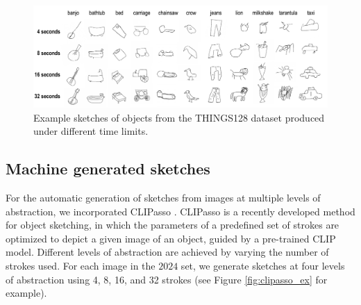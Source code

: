 \documentclass[10pt,letterpaper]{article}
\begin{document}
\begin{figure}
    \centering
    \includegraphics[width= 1\linewidth]{figures/thingsdraw_gallery_alpha.pdf}
    \caption{Example sketches of objects from the THINGS128 dataset produced under different time limits.}
    \label{fig:gallery}
\end{figure}

\subsection{Machine generated sketches}
For the automatic generation of sketches from images at multiple levels of abstraction, we incorporated CLIPasso \cite{vinker2022clipasso}.
CLIPasso is a recently developed method for object sketching, in which the parameters of a predefined set of strokes are optimized to depict a given image of an object, guided by a pre-trained CLIP \cite{radford2021learning} model.
Different levels of abstraction are achieved by varying the number of strokes used. 
For each image in the $2024$ set, we generate sketches at four levels of abstraction using 4, 8, 16, and 32 strokes (see Figure \ref{fig:clipasso_ex} for example).


\end{document}
